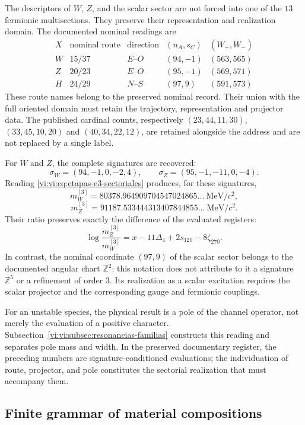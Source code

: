 The descriptors of \(W\), \(Z\), and the scalar sector are not forced
into one of the \(13\) fermionic multisections. They preserve their
representation and realization domain. The documented nominal
readings are
\[
\begin{array}{c|c|c|c|c}
 X&\text{nominal route}&\text{direction}&(n_A,s_C)&(W_+,W_-)\\\hline
 W&15/37&E\text{--}O&(94,-1)&(563,565)\\
 Z&20/23&E\text{--}O&(95,-1)&(569,571)\\
 H&24/29&N\text{--}S&(97,9)&(591,573)
\end{array}
\]
These route names belong to the preserved nominal record. Their
union with the full oriented domain must retain the trajectory,
representation and projector data. The published cardinal
counts, respectively \((23,44,11,30)\), \((33,45,10,20)\) and
\((40,34,22,12)\), are retained alongside the address and are not replaced
by a single label.

For \(W\) and \(Z\), the complete signatures are recovered:
\[
 \sigma_W=(94,-1,0,-2,4),\qquad
 \sigma_Z=(95,-1,-11,0,-4).
\]
Reading \eqref{vi:vi:eq:etapas-e3-sectoriales} produces, for these signatures,
\[
 m_W^{[3]}=80378.964909704547024865\ldots\ \mathrm{MeV}/c^2,
\]
\[
 m_Z^{[3]}=91187.533444313407844855\ldots\ \mathrm{MeV}/c^2.
\]
Their ratio preserves exactly the difference of the evaluated registers:
\[
 \log\frac{m_Z^{[3]}}{m_W^{[3]}}
 =x-11\Delta_4+2s_{120}-8\zeta_{270}.
\]
In contrast, the nominal coordinate \((97,9)\) of the scalar sector belongs
to the documented angular chart \(\mathbb Z^2\): this notation does not
attribute to it a signature \(\mathbb Z^5\) or a refinement of order
\(3\). Its realization as a scalar excitation requires the scalar
projector and the corresponding gauge and fermionic couplings.

For an unstable species, the physical result is a pole of the channel
operator, not merely the evaluation of a positive character.
Subsection~\ref{vi:vi:subsec:resonancias-familias} constructs this reading and
separates pole mass and width. In the preserved documentary register,
the preceding numbers are signature-conditioned evaluations;
the individuation of route, projector, and pole constitutes the sectorial
realization that must accompany them.

\subsection{Finite grammar of material compositions}
\label{vi:vi:subsec:gramatica-compuestos}

